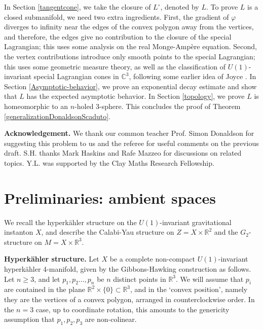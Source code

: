 \documentclass[11pt]{article}
\begin{document}
In Section \ref{tangentcone}, we take the closure of $L^{\circ}$, denoted by $L$. To prove $L$ is a closed submanifold, we need two extra ingredients. First, the gradient of $\varphi$ diverges to infinity near the edges of the convex polygon away from the vertices, and therefore, the edges give no contribution to the closure of the special Lagrangian; this uses some analysis on the real Monge-Amp\`ere equation. Second, the vertex contributions introduce only smooth points to the special Lagrangian; this uses some geometric measure theory, as well as the classification of $U(1)$-invariant special Lagrangian cones in $\mathbb{C}^3$, following some earlier idea of Joyce \cite{MR2122282}. In Section \ref{Asymptotic-behavior}, we prove an exponential decay estimate and show that $L$ has the expected asymptotic behavior. In Section \ref{topology}, we prove $L$ is homeomorphic to an $n$-holed 3-sphere. This concludes the proof of Theorem \ref{generalizationDonaldsonScaduto}. 

\vspace{5pt} 

\textbf{Acknowledgement.} We thank our common teacher Prof. Simon Donaldson for suggesting this problem to us and the referee for useful comments on the previous draft. S.H. thanks Mark Haskins and Rafe Mazzeo for discussions on related topics. Y.L. was supported by the Clay Maths Research Fellowship. 

\section{Preliminaries: ambient spaces}\label{Preliminaries}

We recall the hyperkähler structure on the $U(1)$-invariant gravitational instanton $X$, and describe the Calabi-Yau structure on $Z = X \times \mathbb{R}^2$ and the $G_2$-structure on $M = X \times \mathbb{R}^3$.
\vspace{5pt}

\noindent
\textbf{Hyperkähler structure.} 
Let $X$ be a complete non-compact $U(1)$-invariant hyperkähler 4-manifold, given by the Gibbons-Hawking construction as follows. Let $n\geq 3$, and let $p_1, p_2 \ldots, p_n$ be $n$ distinct points in $\mathbb{R}^3$. We will assume that $p_i$ are contained in the plane $\mathbb{R}^2\times \{0\} \subset \mathbb{R}^3$, and in the `convex position', namely they are the vertices of a convex polygon, arranged in counterclockwise order. In the $n=3$ case, up to coordinate rotation, this amounts to the genericity assumption that $p_1,p_2,p_3$ are non-colinear. 
 
\end{document}
